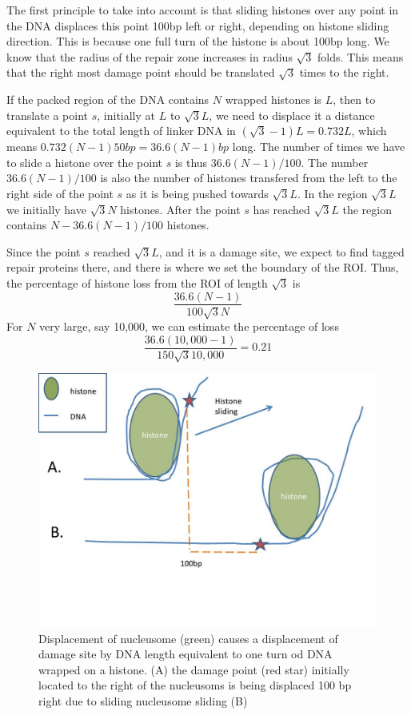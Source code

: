 \documentclass[12pt]{report}
\begin{document}
     The first principle to take into account is that sliding histones over any point in the DNA displaces this point 100bp left or right, depending on histone sliding direction. 
     This is because one full turn of the histone is  about 100bp long. 
     We know that the radius of the repair zone increases in radius $\sqrt{3}$ folds. This means that the right most damage point should be translated $\sqrt{3}$ times to the right. 

     If the packed region of the DNA contains $N$ wrapped histones is $L$, then to translate a point $s$, initially at $L$ to $\sqrt{3}L$, we need to displace it a distance equivalent to the total length of linker DNA in $(\sqrt{3}-1)L=0.732L$, which means $0.732(N-1)50bp=36.6(N-1)bp$ long. The number of times we have to slide a histone over the point $s$ is thus $36.6(N-1)/100$.
     The number $36.6(N-1)/100$ is also the number of histones transfered from the left to the right side of the point $s$ as it is being pushed towards $\sqrt{3}L$.      
     In the region $\sqrt{3}L$ we initially have $\sqrt{3}N$ histones. After the point $s$ has reached $\sqrt{3}L$ the region contains $N-36.6(N-1)/100$ histones. 
     
     Since the point $s$ reached $\sqrt{3}L$, and it is a damage site, we expect to find tagged repair proteins there, and there is where we set the boundary of the ROI. Thus, the percentage of histone loss from the ROI of length $\sqrt{3}$ is
     \begin{equation*}
     \frac{36.6(N-1)}{100\sqrt{3}N}
     \end{equation*}
     For $N$ very large, say 10,000, we can estimate the percentage of loss 
	\begin{equation*}
     \frac{36.6(10,000-1)}{150\sqrt{3}10,000}= 0.21
	\end{equation*}
     
     
	\begin{figure}
	\centering
	\includegraphics[width=0.7\linewidth]{histoneSlidingSingle}
	\caption{Displacement of nucleusome (green) causes a displacement of damage site by DNA length equivalent to one turn od DNA wrapped on a histone. (A) the damage point (red star) initially located to the right of the nucleusoms is being displaced 100 bp right due to sliding nucleusome sliding (B)}
	\label{fig:histoneSlidingSingle}
	\end{figure}
	
\end{document}
